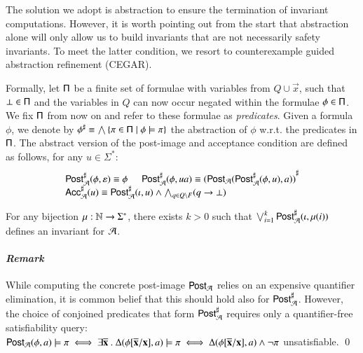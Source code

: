 \documentclass[10pt,conference,letterpaper,twocolumn]{IEEEtran}
\begin{document}
The solution we adopt is abstraction to ensure the termination of
invariant computations. However, it is worth pointing out from the
start that abstraction alone will only allow us to build invariants
that are not necessarily safety invariants. To meet the latter
condition, we resort to counterexample guided abstraction refinement
(CEGAR).

Formally, let $\mathsf{\Pi}$ be a finite set of formulae with variables from
$Q \cup \vec{x}$, such that $\bot \in \mathsf{\Pi}$ and the variables in $Q$
can now occur negated within the formulae $\phi \in \mathsf{\Pi}$. We fix
$\mathsf{\Pi}$ from now on and refer to these formulae as
\emph{predicates}. Given a formula $\phi$, we denote by ${\phi}^\sharp
\equiv \bigwedge \left\{ \pi \in \mathsf{\Pi} \mid \phi \models \pi \right\}$ the
abstraction of $\phi$ w.r.t. the predicates in $\mathsf{\Pi}$. The abstract
version of the post-image and acceptance condition are defined as
follows, for any $u \in \Sigma^*$:
\[\begin{array}{l}
{\mathsf{Post}}^\sharp_{\mathcal{A}}(\phi,\varepsilon) \equiv \phi \hspace*{5mm}
{\mathsf{Post}}^\sharp_{\mathcal{A}}(\phi,ua) \equiv {(\mathsf{Post}_{\mathcal{A}}({\mathsf{Post}}^\sharp_{\mathcal{A}}(\phi,u),a))}^\sharp \\
{\mathsf{Acc}}^\sharp_{\mathcal{A}}(u) \equiv {\mathsf{Post}}^\sharp_{\mathcal{A}}(\iota,u) \wedge \bigwedge_{q \in Q \setminus F} 
(q \rightarrow \bot)
\end{array}\]
\begin{lemma}\label{lemma:abstract-invariant}
  For any bijection $\mu : {\bf \mathbb{N}} \rightarrow \Sigma^*$, there exists
  $k>0$ such that $\bigvee_{i=1}^k {\mathsf{Post}}^\sharp_{\mathcal{A}}(\iota,\mu(i))$ defines
  an invariant for $\mathcal{A}$. 
\end{lemma}

\paragraph{\em Remark}
While computing the concrete post-image $\mathsf{Post}_{\mathcal{A}}$ relies on an
expensive quantifier elimination, it is common belief that this should
hold also for ${\mathsf{Post}}^\sharp_{\mathcal{A}}$. However, the choice of conjoined
predicates that form ${\mathsf{Post}}^\sharp_{\mathcal{A}}$ requires only a quantifier-free
satisfiability query: $\mathsf{Post}_{\mathcal{A}}(\phi,a) \models \pi \iff \exists
\overline{\mathbf x} ~.~ \Delta(\phi[\overline{\mathbf x}/\mathbf x],a)
\models \pi \iff \Delta(\phi[\overline{\mathbf x}/\mathbf x],a) \wedge
\neg\pi$ unsatisfiable. \qed
\end{document}
